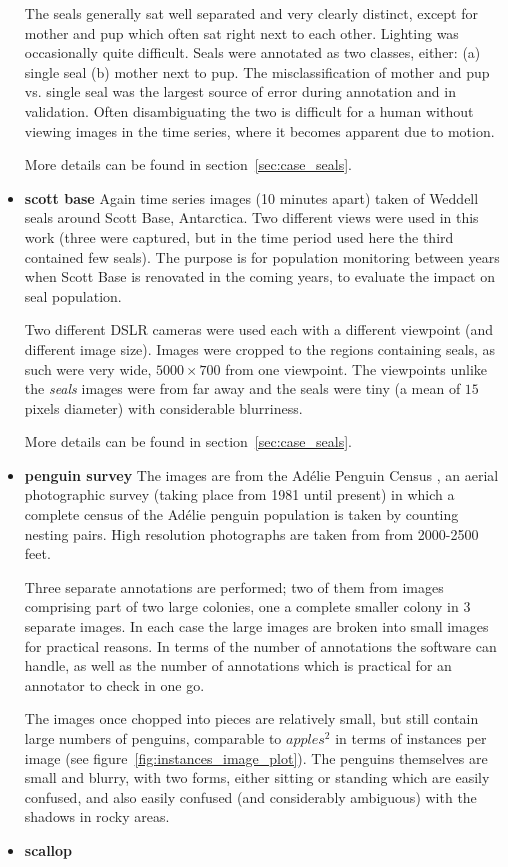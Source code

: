 \begin{itemize}
The seals generally sat well separated and very clearly distinct, except for mother and pup which often sat right next to each other. Lighting was occasionally quite difficult. Seals were annotated as two classes, either: (a) single seal (b) mother next to pup.  The misclassification of mother and pup vs. single seal was the largest source of error during annotation and in validation. Often disambiguating the two is difficult for a human without viewing images in the time series, where it becomes apparent due to motion.

More details can be found in section~\ref{sec:case_seals}.

    \item{\bf{scott base}}
Again time series images (10 minutes apart) taken of Weddell seals around Scott Base, Antarctica. Two different views were used in this work (three were captured, but in the time period used here the third contained few seals). The purpose is for population monitoring between years when Scott Base is renovated in the coming years, to evaluate the impact on seal population.

Two different DSLR cameras were used each with a different viewpoint (and different image size). Images were cropped to the regions containing seals, as such were very wide, $5000\times700$ from one viewpoint. The viewpoints unlike the \emph{seals} images were from far away and the seals were tiny (a mean of $15$ pixels diameter) with considerable blurriness.  
    
More details can be found in section~\ref{sec:case_seals}.
    
    \item{\bf{penguin survey}}
The images are from the Adélie Penguin Census \cite{Lyver2014}, an aerial photographic survey (taking place from 1981 until present) in which a complete census of the Adélie penguin population is taken by counting nesting pairs. High resolution photographs are taken from from 2000-2500 feet.

Three separate annotations are performed; two of them from images comprising part of two large colonies, one a complete smaller colony in 3 separate images. In each case the large images are broken into small images for practical reasons. In terms of the number of annotations the software can handle, as well as the number of annotations which is practical for an annotator to check in one go.
    
The images once chopped into pieces are relatively small, but still contain large numbers of penguins, comparable to $apples^2$ in terms of instances per image (see figure~\ref{fig:instances_image_plot}). The penguins themselves are small and blurry, with two forms, either sitting or standing which are easily confused, and also easily confused (and considerably ambiguous) with the shadows in rocky areas.  
    \item{\bf{scallop}}
    

\end{itemize}
